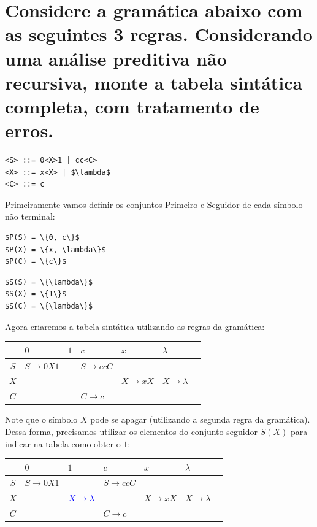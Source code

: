 \documentclass{article}
\begin{document}
\newpage
\section{Considere a gramática abaixo com as seguintes 3 regras. Considerando uma análise preditiva não recursiva, monte a tabela sintática completa, com tratamento de erros.}



\begin{lstlisting}
<S> ::= 0<X>1 | cc<C>
<X> ::= x<X> | $\lambda$
<C> ::= c
\end{lstlisting}


Primeiramente vamos definir os conjuntos Primeiro e Seguidor de cada símbolo não terminal:


\begin{lstlisting}
$P(S) = \{0, c\}$
$P(X) = \{x, \lambda\}$
$P(C) = \{c\}$
\end{lstlisting} 
 
 
 
\begin{lstlisting} 
$S(S) = \{\lambda\}$
$S(X) = \{1\}$
$S(C) = \{\lambda\}$
\end{lstlisting} 


Agora criaremos a tabela sintática utilizando as regras da gramática:
\\


\begin{center}
\begin{tabular}{ |c|m{2cm}|m{2cm}|m{2cm}|m{2cm}|m{2cm}|m{2cm}| } 
 \hline
 & $0$ & $1$ & $c$ & $x$ & $\lambda$\\
 \hline
 $S$ & $S \rightarrow 0X1$ & $ $ & $S \rightarrow ccC$ & $ $ & $ $ \\
 \hline
 $X$ & $ $ & $ $ & $ $ & $X \rightarrow xX$ & $X \rightarrow \lambda$\\
 \hline
 $C$ & $ $ & $ $ & $C \rightarrow c$ & $ $ & $ $\\
 \hline
\end{tabular}
\end{center} 


Note que o símbolo $X$ pode se apagar (utilizando a segunda regra da gramática). Dessa forma, precisamos utilizar os elementos do conjunto seguidor $S(X)$ para indicar na tabela como obter o $1$:
\\


\begin{center}
\begin{tabular}{ |c|m{2cm}|m{2cm}|m{2cm}|m{2cm}|m{2cm}|m{2cm}| } 
 \hline
 & $0$ & $1$ & $c$ & $x$ & $\lambda$\\
 \hline
 $S$ & $S \rightarrow 0X1$ & $ $ & $S \rightarrow ccC$ & $ $ & $ $ \\
 \hline
 $X$ & $ $ & $\color{blue}{X \rightarrow \lambda}$ & $ $ & $X \rightarrow xX$ & $X \rightarrow \lambda$\\
 \hline
 $C$ & $ $ & $ $ & $C \rightarrow c$ & $ $ & $ $\\
 \hline
\end{tabular}
\end{center} 
\end{document}
